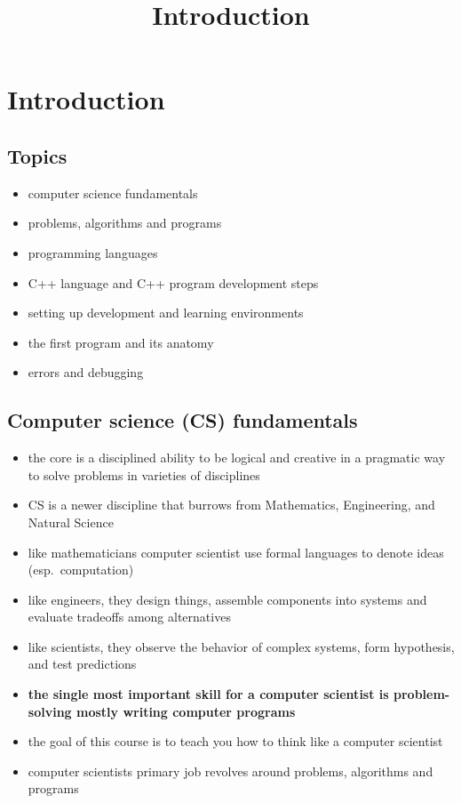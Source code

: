 \documentclass[11pt]{article}
\title{Introduction}
\providecommand{\tightlist}{%
      \setlength{\itemsep}{0pt}\setlength{\parskip}{0pt}}
\begin{document}
    
    \maketitle
    
    

    
    \hypertarget{introduction}{%
\section{Introduction}\label{introduction}}

\hypertarget{topics}{%
\subsection{Topics}\label{topics}}

\begin{itemize}
\tightlist
\item
  computer science fundamentals
\item
  problems, algorithms and programs
\item
  programming languages
\item
  C++ language and C++ program development steps
\item
  setting up development and learning environments
\item
  the first program and its anatomy
\item
  errors and debugging
\end{itemize}

    \hypertarget{computer-science-cs-fundamentals}{%
\subsection{Computer science (CS)
fundamentals}\label{computer-science-cs-fundamentals}}

\begin{itemize}
\item
  the core is a disciplined ability to be logical and creative in a
  pragmatic way to solve problems in varieties of disciplines
\item
  CS is a newer discipline that burrows from Mathematics, Engineering,
  and Natural Science
\item
  like mathematicians computer scientist use formal languages to denote
  ideas (esp.~computation)
\item
  like engineers, they design things, assemble components into systems
  and evaluate tradeoffs among alternatives
\item
  like scientists, they observe the behavior of complex systems, form
  hypothesis, and test predictions
\item
  \textbf{the single most important skill for a computer scientist is
  problem-solving mostly writing computer programs}
\item
  the goal of this course is to teach you how to think like a computer
  scientist
\item
  computer scientists primary job revolves around problems, algorithms
  and programs
\end{itemize}
\end{document}
